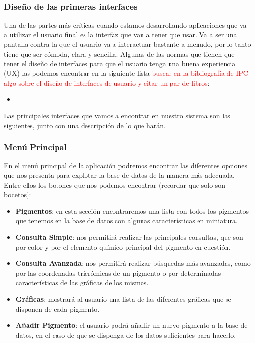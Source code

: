 \subsubsection{Diseño de las primeras interfaces}

Una de las partes más críticas cuando estamos desarrollando aplicaciones que va a utilizar el usuario final es la interfaz que van a tener que usar. Va a ser una pantalla contra la que el usuario va a interactuar bastante a menudo, por lo tanto tiene que ser cómoda, clara y sencilla. Algunas de las normas que tienen que tener el diseño de interfaces para que el usuario tenga una buena experiencia (UX) las podemos encontrar en la siguiente lista \textcolor{red}{buscar en la bibliografía de IPC algo sobre el diseño de interfaces de usuario y citar un par de libros}: 
\begin{itemize}
   \item 
\end{itemize}

Las principales interfaces que vamos a encontrar en nuestro sistema son las siguientes, junto con una descripción de lo que harán. 

\subsubsection*{Menú Principal}

En el menú principal de la aplicación podremos encontrar las diferentes opciones que nos presenta para explotar la base de datos de la manera más adecuada. Entre ellos los botones que nos podemos encontrar (recordar que solo son bocetos):
\begin{itemize}
    \item \textbf{Pigmentos}: en esta sección encontraremos una lista con todos los pigmentos que tenemos en la base de datos con algunas características en miniatura.
    \item \textbf{Consulta Simple}: nos permitirá realizar las principales consultas, que son por color y por el elemento químico principal del pigmento en cuestión. 
    \item \textbf{Consulta Avanzada}: nos permitirá realizar búsquedas más avanzadas, como por las coordenadas tricrómicas de un pigmento o por determinadas características de las gráficas de los mismos.
    \item \textbf{Gráficas}: mostrará al usuario una lista de las diferentes gráficas que se disponen de cada pigmento.
    \item \textbf{Añadir Pigmento}: el usuario podrá añadir un nuevo pigmento a la base de datos, en el caso de que se disponga de los datos suficientes para hacerlo. 
\end{itemize}

